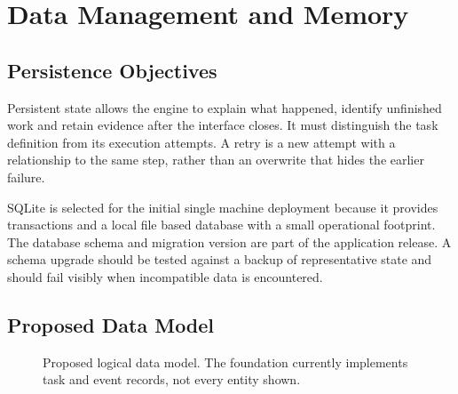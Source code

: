 \chapter{Data Management and Memory}
\section{Persistence Objectives}
Persistent state allows the engine to explain what happened, identify unfinished work and retain evidence after the interface closes. It must distinguish the task definition from its execution attempts. A retry is a new attempt with a relationship to the same step, rather than an overwrite that hides the earlier failure.

SQLite is selected for the initial single machine deployment because it provides transactions and a local file based database with a small operational footprint. The database schema and migration version are part of the application release. A schema upgrade should be tested against a backup of representative state and should fail visibly when incompatible data is encountered.

\section{Proposed Data Model}
\begin{figure}[htbp]\centering
{}
\caption{Proposed logical data model. The foundation currently implements task and event records, not every entity shown.}\label{fig:data}
\end{figure}

